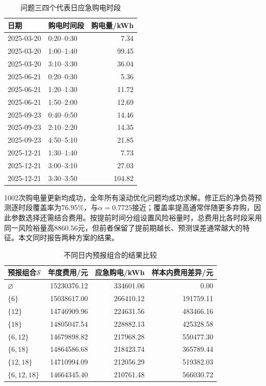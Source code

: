 \documentclass[UTF8,12pt,a4paper]{ctexart}
\theoremstyle{remark}
\begin{document}
\begin{table}[htbp]\centering\scriptsize
\caption{问题三四个代表日应急购电时段}\label{tab:q3-emergency}
\begin{tabular}{llr}\toprule 日期&购电时间段&购电量/kWh\\\midrule
2025-03-20&0:20--0:30&7.34\\
2025-03-20&1:00--1:40&99.45\\
2025-03-20&3:10--3:30&36.04\\
2025-06-21&0:20--0:30&5.36\\
2025-06-21&1:20--1:30&11.72\\
2025-06-21&1:50--2:00&12.69\\
2025-09-23&0:40--0:50&14.46\\
2025-09-23&2:10--2:20&14.35\\
2025-09-23&4:50--5:10&21.85\\
2025-12-21&1:30--1:40&7.73\\
2025-12-21&3:00--3:10&27.03\\
2025-12-21&3:30--3:50&104.82\\\bottomrule\end{tabular}\end{table}

1002次购电量更新均成功，全年所有滚动优化问题均成功求解。修正后的净负荷预测逐时段覆盖率为$76.95\%$，与$\alpha=0.7725$接近；覆盖率提高通常伴随更多弃购，因此参数选择还需结合费用。按提前时间分组设置风险裕量时，总费用比各时段采用同一风险裕量高$8860.56$元，但前者保留了提前期越长、预测误差通常越大的特征。本文同时报告两种方案的结果。

\begin{table}[htbp]\centering\small
\caption{不同日内预报组合的结果比较}\label{tab:q3-ablation}
\begin{tabular}{lrrr}\toprule
预报组合$\mathcal S$&年度费用/元&应急购电/kWh&样本内费用差异/元\\\midrule
$\varnothing$&15230376.12&334601.06&0.00\\
$\{6\}$&15038617.00&266410.12&191759.11\\
$\{12\}$&14746909.96&224631.56&483466.16\\
$\{18\}$&14805047.54&228882.13&425328.58\\
$\{6,12\}$&14679898.82&217968.28&550477.30\\
$\{6,18\}$&14864586.68&218423.74&365789.44\\
$\{12,18\}$&14710994.09&212056.29&519382.03\\
$\{6,12,18\}$&14664345.40&210761.48&566030.72\\\bottomrule
\end{tabular}
\end{table}
\end{document}

